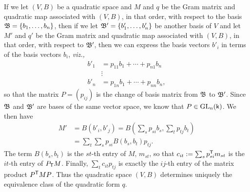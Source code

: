 If we let \((V, B)\) be a quadratic space and \(M\) and \(q\) be the Gram matrix
and quadratic map associated with \((V, B)\), in that order, with respect to the
basis \(\mathfrak{B} =\{b_1, \dots, b_n\}\), then if we let \(\mathfrak{B}' = \{b'_1, \dots,
b'_n\}\) be another basis of \(V\) and let \(M'\) and \(q'\) be the Gram matrix
and quadratic map associated with \((V, B)\), in that order, with respect to
\(\mathfrak{B}'\), then we can express the basis vectors \(b'_i\) in terms of the
basis vectors \(b_i\), \emph{viz.,}\label{sec:quadratic-space-change-of-basis}
\begin{align*}
    b'_1 &= p_{11}b_1 + \cdots + p_{n1}b_n\\
    &\vdots\\
    b'_n &= p_{1n}b_1 + \cdots + p_{nn}b_n,
\end{align*}
so that the matrix \(P = (p_{ij})\) is the change of basis matrix from
\(\mathfrak{B}\) to \(\mathfrak{B}'\). Since \(\mathfrak{B}\) and \(\mathfrak{B}'\) are bases of the
same vector space, we know that \(P \in \mathrm{GL}_{n}(\mathsf{k})\). We then have
\begin{align*}
  M' &= B(b'_i, b'_j) = B\left(\sum_{s} p_{si}b_s, \sum_t p_{tj}b_t\right)\\
  &= \sum_t \sum_s p_{si}B(b_s, b_t)p_{tj}.
\end{align*}
The term \(B(b_s, b_t)\) is the \(st\)-th entry of \(M\), \(m_{st}\), so that
\(c_{it} := \sum_s p^{\mathsf{T}}_{si}m_{st}\) is the \(it\)-th entry of
\(P_{\mathsf{T}}M\). Finally, \(\sum_t c_{it}p_{tj}\) is exactly the \(ij\)-th
entry of the matrix product \(P^{\mathsf{T}}MP\). Thus the quadratic space \((V,
B)\) determines uniquely the equivalence class of the quadratic form \(q\).

